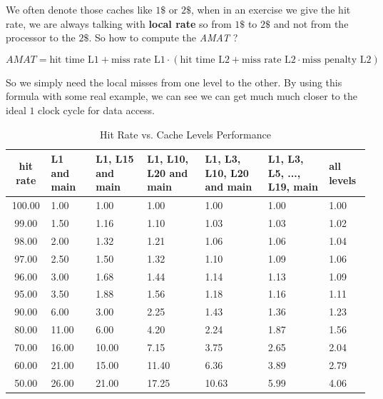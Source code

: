 \documentclass{report}
\begin{document}
We often denote those caches like $1\$$ or $2\$$, when in an exercise we give the hit rate, we are always talking with \textbf{local rate} so from $1\$$ to $2\$$ and not from the processor to the $2\$$. So how to compute the \textit{AMAT} ?

\begin{equation}
    AMAT = \text{hit time L1} + \text{miss rate L1} \cdot (\text{hit time L2} + \text{miss rate L2}\cdot \text{miss penalty L2})
\end{equation}

So we simply need the local misses from one level to the other. By using this formula with some real example, we can see we can get much much closer to the ideal $1$ clock cycle for data access.

\begin{table}[H]
    \centering
    \begin{tabular}{|c|p{1.6cm}|p{1.6cm}|p{1.6cm}|p{1.6cm}|p{1.6cm}|p{1.6cm}|}
        \hline
        \textbf{hit rate} & \textbf{L1 and main} & \textbf{L1, L15 and main} & \textbf{L1, L10, L20 and main} & \textbf{L1, L3, L10, L20 and main} & \textbf{L1, L3, L5, ..., L19, main} & \textbf{all levels} \\
        \hline
        100.00 & 1.00  & 1.00  & 1.00  & 1.00  & 1.00  & 1.00  \\
        99.00  & 1.50  & 1.16  & 1.10  & 1.03  & 1.03  & 1.02  \\
        98.00  & 2.00  & 1.32  & 1.21  & 1.06  & 1.06  & 1.04  \\
        97.00  & 2.50  & 1.50  & 1.32  & 1.10  & 1.09  & 1.06  \\
        96.00  & 3.00  & 1.68  & 1.44  & 1.14  & 1.13  & 1.09  \\
        95.00  & 3.50  & 1.88  & 1.56  & 1.18  & 1.16  & 1.11  \\
        90.00  & 6.00  & 3.00  & 2.25  & 1.43  & 1.36  & 1.23  \\
        80.00  & 11.00 & 6.00  & 4.20  & 2.24  & 1.87  & 1.56  \\
        70.00  & 16.00 & 10.00 & 7.15  & 3.75  & 2.65  & 2.04  \\
        60.00  & 21.00 & 15.00 & 11.40 & 6.36  & 3.89  & 2.79  \\
        50.00  & 26.00 & 21.00 & 17.25 & 10.63 & 5.99  & 4.06  \\
        \hline
    \end{tabular}
    \caption{Hit Rate vs. Cache Levels Performance}
    \label{tab:hit_rate_performance}
\end{table}
\end{document}
